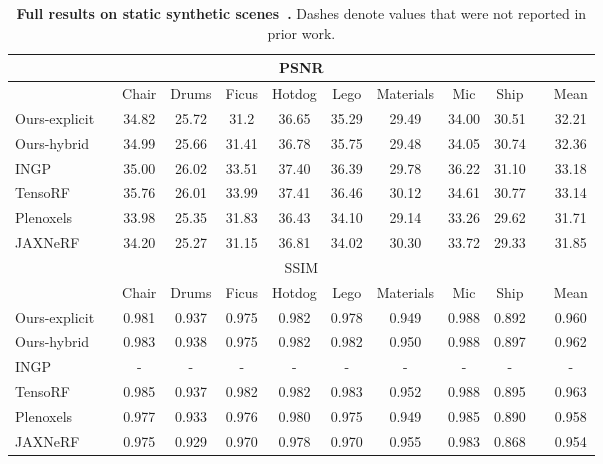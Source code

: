 \documentclass[10pt,twocolumn,letterpaper]{article}
\begin{document}
\renewcommand{\tabcolsep}{6pt}
\begin{table*}
  \centering
  \begin{tabular}{llcccccccclc}
    \multicolumn{12}{c}{PSNR } \\
    \toprule
    && Chair & Drums & Ficus & Hotdog & Lego & Materials & Mic & Ship && Mean \\
    \cmidrule(){1-1} \cmidrule(){3-10} \cmidrule(){12-12}
    Ours-explicit && 34.82 &	25.72 &	31.2 &	36.65 &	35.29 &	29.49 &	34.00 &	30.51 &&	32.21 \\
    Ours-hybrid && 34.99 &	25.66 &	31.41 &	36.78 &	35.75 &	29.48 &	34.05 &	30.74 &&	32.36 \\
INGP~\cite{ingp}                       && 35.00 & 26.02 & 33.51 & 37.40 & 36.39 & 29.78 & 36.22 & 31.10 && 33.18 \\
    TensoRF~\cite{tensorf}                 && 35.76 & 26.01 & 33.99 & 37.41 & 36.46 & 30.12 & 34.61 & 30.77 && 33.14 \\
    Plenoxels~\cite{plenoxels}             && 33.98 & 25.35 & 31.83 & 36.43 & 34.10 & 29.14 & 33.26 & 29.62 && 31.71 \\
    JAXNeRF~\cite{jaxnerf2020github, nerf} && 34.20 & 25.27 & 31.15 & 36.81 & 34.02 & 30.30 & 33.72 & 29.33 && 31.85 \\
    \bottomrule
    \multicolumn{12}{c}{SSIM } \\
    \toprule
    && Chair & Drums & Ficus & Hotdog & Lego & Materials & Mic & Ship && Mean \\ 
    \cmidrule(){1-1} \cmidrule(){3-10} \cmidrule(){12-12}
    Ours-explicit && 0.981 &	0.937 &	0.975 &	0.982 &	0.978 &	0.949 &	0.988 &	0.892 &&	0.960 \\
    Ours-hybrid && 0.983 &	0.938 &	0.975 &	0.982 &	0.982 &	0.950 &	0.988 &	0.897 &&	0.962 \\
INGP          && -     & -     & -     & -     & -     & -     & -     & -     && -     \\
    TensoRF       && 0.985 & 0.937 & 0.982 & 0.982 & 0.983 & 0.952 & 0.988 & 0.895 && 0.963 \\
    Plenoxels     && 0.977 & 0.933 & 0.976 & 0.980 & 0.975 & 0.949 & 0.985 & 0.890 && 0.958 \\
    JAXNeRF       && 0.975 & 0.929 & 0.970 & 0.978 & 0.970 & 0.955 & 0.983 & 0.868 && 0.954 \\
    \bottomrule
  \end{tabular}
  \caption{\textbf{Full results on static synthetic scenes~\cite{nerf}.} Dashes denote values that were not reported in prior work.}
  \label{tab:fullsynthetic}
\end{table*}
\end{document}

